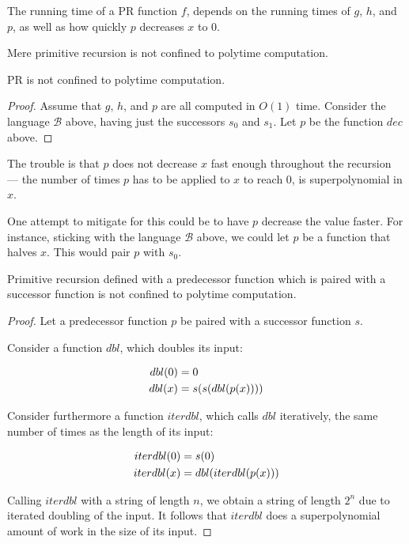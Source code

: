 The running time of a PR function $f$, depends on the running times of $g$,
$h$, and $p$, as well as how quickly $p$ decreases $x$ to $0$.

Mere primitive recursion is not confined to polytime computation.

\begin{theorem}
PR is not confined to polytime computation.
\end{theorem}

\begin{proof} Assume that $g$, $h$, and $p$ are all computed in $O(1)$ time.
Consider the language $\mathcal{B}$ above, having just the successors $s_0$ and
$s_1$. Let $p$ be the function $dec$ above.\end{proof}

The trouble is that $p$ does not decrease $x$ fast enough throughout the
recursion --- the number of times $p$ has to be applied to $x$ to reach $0$, is
superpolynomial in $x$.

One attempt to mitigate for this could be to have $p$ decrease the value
faster. For instance, sticking with the language $\mathcal{B}$ above, we could
let $p$ be a function that halves $x$. This would pair $p$ with $s_0$.

\begin{theorem}

Primitive recursion defined with a predecessor function which is paired with a
successor function is not confined to polytime computation.

\end{theorem}

\begin{proof} Let a predecessor function $p$ be paired with a successor
function $s$.

Consider a function $dbl$, which doubles its input:

\begin{align}
dbl{\mathopen{}\left({0}\right)\mathclose{}} &= 0 \\
dbl{\mathopen{}\left({x}\right)\mathclose{}} &= s{\mathopen{}\left({s{\mathopen{}\left({dbl{\mathopen{}\left({p{\mathopen{}\left({x}\right)\mathclose{}}}\right)\mathclose{}}}\right)\mathclose{}}}\right)\mathclose{}}
\end{align}

Consider furthermore a function $iterdbl$, which calls $dbl$ iteratively, the
same number of times as the length of its input:

\begin{align}
iterdbl{\mathopen{}\left({0}\right)\mathclose{}} &= s{\mathopen{}\left({0}\right)\mathclose{}} \\
iterdbl{\mathopen{}\left({x}\right)\mathclose{}} &= dbl{\mathopen{}\left({iterdbl{\mathopen{}\left({p{\mathopen{}\left({x}\right)\mathclose{}}}\right)\mathclose{}}}\right)\mathclose{}}
\end{align}

Calling $iterdbl$ with a string of length $n$, we obtain a string of length
$2^n$ due to iterated doubling of the input. It follows that $iterdbl$ does a
superpolynomial amount of work in the size of its input.\end{proof}

